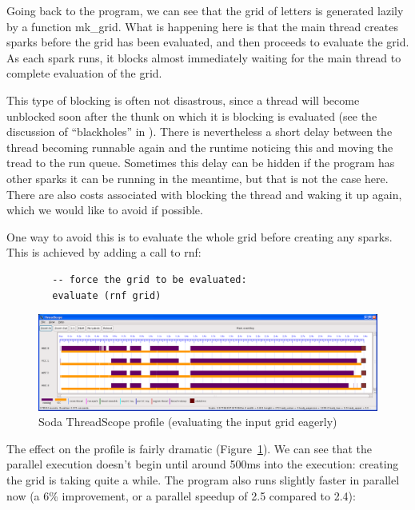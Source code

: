 \documentclass[twocolumn,9pt]{sigplanconf}
\newcommand{\codef}[1]{{\fontfamily{cmss}\small#1}}
\begin{document}
Going back to the program, we can see that the grid of letters is
generated lazily by a function \codef{mk\_grid}.  What is happening here is
that the main thread creates sparks before the grid has been
evaluated, and then proceeds to evaluate the grid.  As each spark
runs, it blocks almost immediately waiting for the main thread to
complete evaluation of the grid.

This type of blocking is often not disastrous, since a thread will become
unblocked soon after the thunk on which it is blocking is evaluated
(see the discussion of ``blackholes'' in \citet{multicore-ghc}).  There
is nevertheless a short delay between the thread becoming runnable
again and the runtime noticing this and moving the tread to the run
queue.  Sometimes this delay can be hidden if the program has other
sparks it can be running in the meantime, but that is not the case
here.  There are also costs associated with blocking the thread and waking
it up again, which we would like to avoid if possible.

One way to avoid this is to evaluate the whole grid before creating
any sparks.  This is achieved by adding a call to \codef{rnf}:

\begin{lstlisting}
        -- force the grid to be evaluated:
        evaluate (rnf grid)
\end{lstlisting}

\begin{figure}
\begin{center}
\includegraphics[scale=0.3]{soda3.png}
\end{center}
\caption{Soda ThreadScope profile (evaluating the input grid eagerly)}
\label{f:soda-threadscope3}
\end{figure}

The effect on the profile is fairly dramatic
(Figure~\ref{f:soda-threadscope3}).  We can see that the parallel
execution doesn't begin until around 500ms into the execution:
creating the grid is taking quite a while.  The program also runs
slightly faster in parallel now (a 6\% improvement, or a parallel
speedup of 2.5 compared to 2.4):
\end{document}
